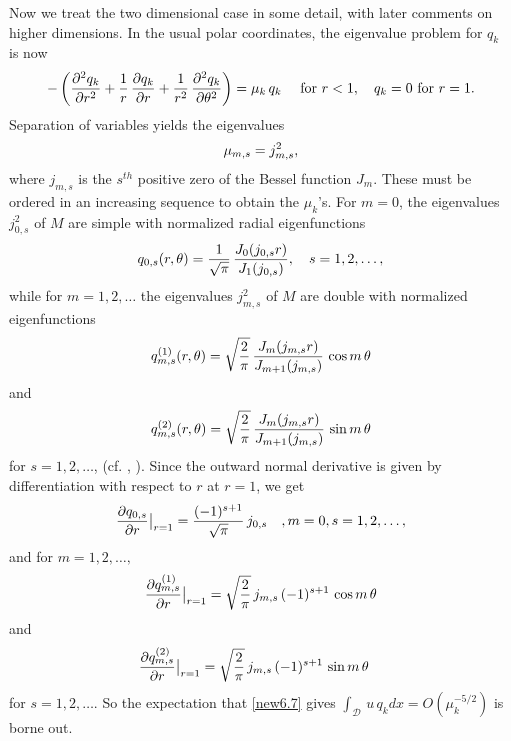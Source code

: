 \documentclass[final]{siamltex}
\numberwithin{equation}{section}
\begin{document}
Now we treat the two dimensional case in some detail, with later comments on higher dimensions. In the usual polar coordinates, the eigenvalue problem for $q_k$ is now
\begin{equation} \notag
-\left(\frac{\partial^2 q_k}{\partial r^2} + \frac{1}{r}\, \frac{\partial q_k}{\partial r} + \frac{1}{r^2}\, \frac{\partial^2 q_k}{\partial \theta^2}\right)=\mu_k \, q_k
\quad \text{ for } r<1, \quad q_k =0 \text{ for } r=1.
\end{equation}
Separation of variables yields the eigenvalues
\begin{equation} \notag
\mu_{m,s}=j_{m,s}^2,
\end{equation}
where $j_{m,s}$ is the $s^{th}$ positive zero of the Bessel function $J_m$. These must be ordered in an increasing sequence to obtain the $\mu_k$'s. For $m=0$, the eigenvalues $j_{0,s}^2$ of $M$ are simple with normalized radial eigenfunctions
\begin{equation} \notag
q_{0,s}(r, \theta)= \frac{1}{\sqrt{\pi}}\, \frac{J_0(j_{0,s} r)}{J_1(j_{0,s})}, \quad s=1, 2, \ldots,
\end{equation}
while for $m=1,2, \ldots$ the eigenvalues $j_{m,s}^2$ of $M$ are double with normalized
eigenfunctions
\begin{equation} \notag
q_{m,s}^{(1)}(r, \theta)= \sqrt{\frac{2}{\pi}} \, \frac{J_m(j_{m,s} r)}{J_{m+1}(j_{m,s})} \, \cos{ m \, \theta}
\end{equation}
and
\begin{equation} \notag
q_{m,s}^{(2)}(r, \theta)= \sqrt{\frac{2}{\pi}} \, \frac{J_m(j_{m,s} r)}{J_{m+1}(j_{m,s})} \, \sin{ m \, \theta}
\end{equation}
for $s=1, 2, \ldots$, (cf. \cite{AS}, \cite{Hilde}). Since the outward normal derivative is given by differentiation with respect to $r$ at $r=1$, we get
\begin{equation} \notag
\frac{\partial q_{0,s}}{\partial r}\big|_{r=1}= \frac{(-1)^{s+1}}{\sqrt{\pi}} \, j_{0,s} \quad , m=0, s=1, 2, \ldots,
\end{equation}
and for $m=1, 2, \ldots, $
\begin{equation} \notag
\frac{\partial q^{(1)}_{m,s}}{\partial r}\big|_{r=1}= \sqrt{\frac{2}{\pi}} \, j_{m,s} \, (-1)^{s+1} \, \cos{m \, \theta}
\end{equation}
and
\begin{equation} \notag
\frac{\partial q^{(2)}_{m,s}}{\partial r}\big|_{r=1}= \sqrt{\frac{2}{\pi}} \, j_{m,s} \, (-1)^{s+1} \, \sin{m \, \theta} \quad
\end{equation}
for $s=1, 2, \ldots$. So the expectation that \eqref{new6.7} gives $\int_{\mathcal{D}} \, u \, q_k dx = O(\mu_k^{-5/2})$ is borne out.
\end{document}
